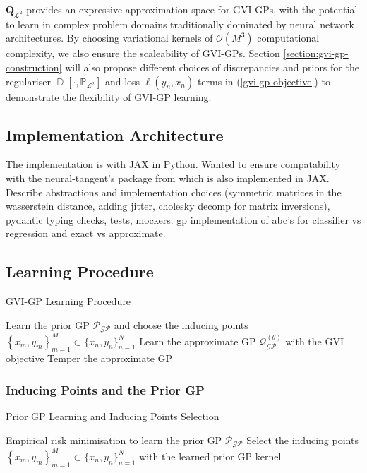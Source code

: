 \documentclass{article}
\newcommand{\D}{\operatorname{\mathbb{D}}}
\newcommand{\GP}{\operatorname{\mathcal{GP}}}
\numberwithin{equation}{section}
\begin{document}
$\boldsymbol{Q}_{\mathcal{L}^2}$ provides an expressive approximation space for GVI-GPs, with the potential to learn in complex problem domains traditionally dominated by neural network architectures.
By choosing variational kernels of $\mathcal{O}(M^3)$ computational complexity, we also ensure the scaleability of GVI-GPs. 
Section \ref{section:gvi-gp-construction} will also propose different choices of discrepancies and priors for the regulariser $\D\left[\cdot, \mathbb{P}_{\mathcal{L}^2}\right]$ and loss $\ell(y_n, x_n)$ terms in (\ref{gvi-gp-objective}) to demonstrate the flexibility of GVI-GP learning.

\subsection{Implementation Architecture}

The implementation is with JAX in Python. Wanted to ensure compatability with the neural-tangent's package from \cite{novak2019neural} which is also implemented in JAX. Describe abstractions and implementation choices (symmetric matrices in the wasserstein distance, adding jitter, cholesky decomp for matrix inversions), pydantic typing checks, tests, mockers. gp implementation of abc's for classifier vs regression and exact vs approximate.

\subsection{Learning Procedure}

\begin{algorithm}
\caption{GVI-GP Learning Procedure}\label{alg:gvi-gp}
\begin{algorithmic}
\State Learn the prior GP $\mathcal{P}_{\GP}$ and choose the inducing points $\left\{x_m, y_m\right\}_{m=1}^{M} \subset \{x_n, y_n\}_{n=1}^{N}$
\State Learn the approximate GP $\mathcal{Q}_{\GP}^{(\theta)}$ with the GVI objective
\State Temper the approximate GP
\end{algorithmic}
\end{algorithm}

\subsubsection{Inducing Points and the Prior GP}

\begin{algorithm}
\caption{Prior GP Learning and Inducing Points Selection}\label{alg:gvi-gp}
\begin{algorithmic}
\State Empirical risk minimisation to learn the prior GP $\mathcal{P}_{\GP}$
\State  Select the inducing points $\left\{x_m, y_m\right\}_{m=1}^{M} \subset \{x_n, y_n\}_{n=1}^{N}$ with the learned prior GP kernel
\EndWhile
\end{algorithmic}
\end{algorithm}
\end{document}
